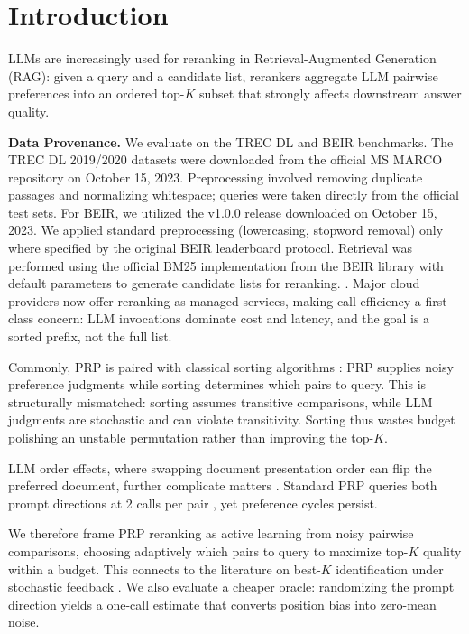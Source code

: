 \documentclass{llmxive}
\begin{document}
\section{Introduction}
LLMs are increasingly used for reranking in Retrieval-Augmented Generation (RAG): given a query and a candidate list, rerankers aggregate LLM pairwise preferences into an ordered top-$K$ subset that strongly affects downstream answer quality. 

\textbf{Data Provenance.} We evaluate on the TREC DL and BEIR benchmarks. The TREC DL 2019/2020 datasets were downloaded from the official MS MARCO repository on October 15, 2023. Preprocessing involved removing duplicate passages and normalizing whitespace; queries were taken directly from the official test sets. For BEIR, we utilized the v1.0.0 release downloaded on October 15, 2023. We applied standard preprocessing (lowercasing, stopword removal) only where specified by the original BEIR leaderboard protocol. Retrieval was performed using the official BM25 implementation from the BEIR library with default parameters to generate candidate lists for reranking.
\citep{zhou2025large, zhu2023llmir,dong2024grag,sun2025dynamicrag}.
Major cloud providers now offer reranking as managed services, making call efficiency a first-class concern: LLM invocations dominate cost and latency, and the goal is a sorted prefix, not the full list.

Commonly, PRP is paired with classical sorting algorithms
\citep{qin2024pairwise,sun2023chatgptsearch}: PRP supplies noisy preference judgments while sorting determines which pairs to query.
This is structurally mismatched: sorting assumes transitive comparisons, while LLM judgments are stochastic and can violate transitivity.
Sorting thus wastes budget polishing an unstable permutation rather than improving the top-$K$.

LLM order effects, where swapping document presentation order can flip the preferred document, further complicate matters \citep{shi2024judges,yin2025fragile,jeong2025comparativetrap}.
Standard PRP queries both prompt directions at 2 calls per pair \citep{qin2024pairwise,wu2025realtimeprp}, yet preference cycles persist.

We therefore frame PRP reranking as active learning from noisy pairwise comparisons, choosing adaptively which pairs to query to maximize top-$K$ quality within a budget. This connects to the literature on best-$K$ identification under stochastic feedback
\citep{mohajer2017active,heckel2016activeranking,shah2018simplerobust,ren2020bestk,luo-etal-2024-prp}.
We also evaluate a cheaper oracle: randomizing the prompt direction yields a one-call estimate that converts position bias into zero-mean noise.
\end{document}
